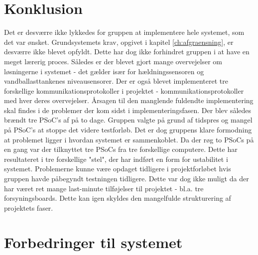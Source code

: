 \chapter{Konklusion}


Det er desværre ikke lykkedes for gruppen at implementere hele systemet, som det var ønsket. Grundsystemets krav, opgivet i kapitel \ref{ch:afgraensning}, er desværre ikke blevet opfyldt. Dette har dog ikke forhindret gruppen i at have en meget lærerig proces. Således er der blevet gjort mange overvejelser om løsningerne i systemet - det gælder især for hældningssensoren og vandballasttankenes niveausensorer.
Der er også blevet implementeret tre forskellige kommunikationsprotokoller i projektet - kommunikationsprotokoller med hver deres overvejelser. Årsagen til den manglende fuldendte implementering skal findes i de problemer der kom sidst i implementeringsfasen. Der blev således brændt tre PSoC's af på to dage. Gruppen valgte på grund af tidspres og mangel på PSoC's at stoppe det videre testforløb. Det er dog gruppens klare formodning at problemet ligger i hvordan systemet er sammenkoblet. Da der røg to PSoCs på en gang var der tilknyttet tre PSoCs fra tre forskellige computere. Dette har resultateret i tre forskellige "stel", der har indført en form for ustabilitet i systemet.
Problemerne kunne være opdaget tidligere i projektforløbet hvis gruppen havde påbegyndt testningen tidligere. Dette var dog ikke muligt da der har været ret mange last-minute tilføjelser til projektet - bl.a. tre forsyningsboards. Dette kan igen skyldes den mangelfulde strukturering af projektets faser.

\chapter{Forbedringer til systemet}